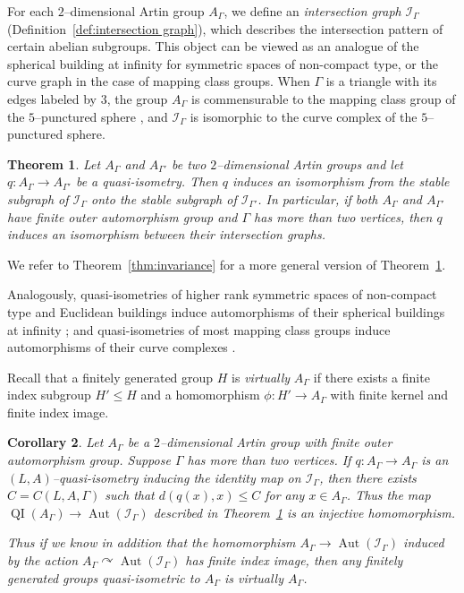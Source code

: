 \documentclass[11pt]{amsart}
\newcommand{\QI}{\operatorname{QI}}
\newcommand{\Aut}{\operatorname{Aut}}
\newcommand {\I}{\mathcal I}
\newtheorem{theorem}{Theorem}[section]
\newtheorem{corollary}[theorem]{Corollary}
\theoremstyle{definition}
\newcommand{\act}{\curvearrowright}
\begin{document}
For each $2$--dimensional Artin group $A_\Gamma$, we define an \emph{intersection graph} $\I_\Gamma$ (Definition~\ref{def:intersection graph}), which describes the intersection pattern of certain abelian subgroups. This object can be viewed as an analogue of the spherical building at infinity for symmetric spaces of non-compact type, or the curve graph in the case of mapping class groups. When $\Gamma$ is a triangle with its edges labeled by $3$, the group $A_\Gamma$ is commensurable to the mapping class group of the $5$--punctured sphere \cite{CharneyCrispAutomorphism}, and $\I_\Gamma$ is isomorphic to the curve complex of the $5$--punctured sphere.
\begin{theorem}
	\label{thm:intro2}
	Let $A_{\Gamma}$ and $A_{\Gamma'}$ be two $2$--dimensional Artin groups and let $q\colon A_\Gamma\to A_{\Gamma'}$ be a quasi-isometry. Then $q$ induces an isomorphism from the stable subgraph of $\I_{\Gamma}$ onto the stable subgraph of $\I_{\Gamma'}$. In particular, if both $A_\Gamma$ and $A_{\Gamma'}$ have finite outer automorphism group and $\Gamma$ has more than two vertices, then $q$ induces an isomorphism between their intersection graphs.
\end{theorem}
We refer to Theorem~\ref{thm:invariance} for a more general version of Theorem~\ref{thm:intro2}.

Analogously, quasi-isometries of higher rank symmetric spaces of non-compact type and Euclidean buildings induce automorphisms of their spherical buildings at infinity \cite{kleiner1997rigidity,eskin1997quasi}; and quasi-isometries of most mapping class groups induce automorphisms of their curve complexes \cite{hamenstaedt2005geometry,behrstock2012geometry,behrstock2017quasiflats}.

Recall that a finitely generated group $H$ is \emph{virtually} $A_\Gamma$ if there exists a finite index subgroup $H'\le H$ and a homomorphism $\phi\colon H'\to A_\Gamma$ with finite kernel and finite index image.

\begin{corollary}
	\label{cor:injective}
	Let $A_{\Gamma}$ be a $2$--dimensional Artin group with finite outer automorphism group. Suppose $\Gamma$ has more than two vertices. If $q\colon A_\Gamma\to A_\Gamma$ is an $(L,A)$--quasi-isometry inducing the identity map on $\I_\Gamma$, then there exists $C=C(L,A,\Gamma)$ such that $d(q(x),x)\le C$ for any $x\in A_\Gamma$. Thus the map $\QI(A_\Gamma)\to \Aut(\I_\Gamma)$ described in Theorem~\ref{thm:intro2} is an injective homomorphism.
	
	Thus if we know in addition that the homomorphism $A_\Gamma\to \Aut(\I_\Gamma)$ induced by the action $A_\Gamma\act \Aut(\I_\Gamma)$ has finite index image, then any finitely generated groups quasi-isometric to $A_\Gamma$ is virtually $A_\Gamma$.
\end{corollary}
\end{document}
